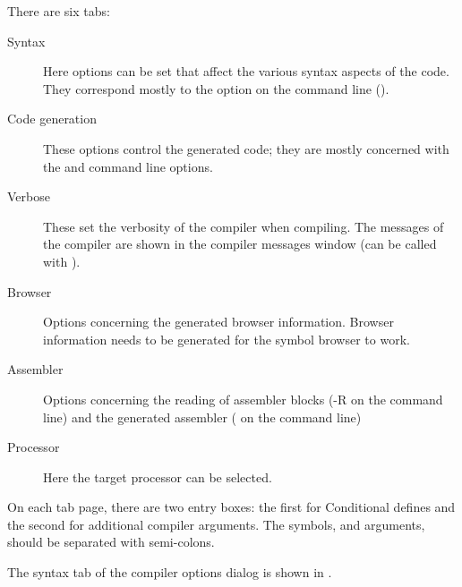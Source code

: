 There are six tabs:
\begin{description}
\item[Syntax] Here options can be set that affect the various syntax aspects
of the code. They correspond mostly to the  option on the command
line ().
\item[Code generation] These options control the generated code; they are
mostly concerned with the  and  command line options.
\item[Verbose] These set the verbosity of the compiler when compiling. The
messages of the compiler are shown in the compiler messages window (can be
called with ).
\item[Browser] Options concerning the generated browser information. Browser
information needs to be generated for the symbol browser to work.
\item[Assembler] Options concerning the reading of assembler blocks (-R on
the command line) and the generated assembler ( on the command line)
\item[Processor] Here the target processor can be selected.
\end{description}

On each tab page, there are two entry boxes: the first for
Conditional defines and the second for additional compiler arguments.
The symbols, and arguments, should be separated with semi-colons.

The syntax tab of the compiler options dialog is shown in .


